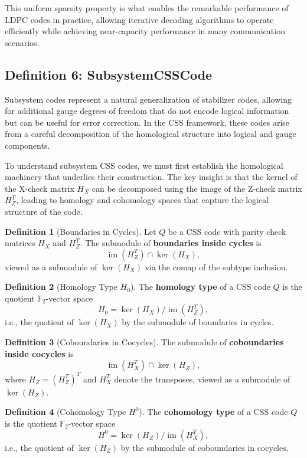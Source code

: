 \documentclass[11pt]{article}
\theoremstyle{plain}
\theoremstyle{definition}
\newtheorem*{definition}{Definition}
\theoremstyle{remark}
\renewcommand{\ker}{\operatorname{ker}}
\begin{document}
This uniform sparsity property is what enables the remarkable performance of LDPC codes in practice, allowing iterative decoding algorithms to operate efficiently while achieving near-capacity performance in many communication scenarios.

\vspace{1em}

\subsection{Definition 6: SubsystemCSSCode}

Subsystem codes represent a natural generalization of stabilizer codes, allowing for additional gauge degrees of freedom that do not encode logical information but can be useful for error correction. In the CSS framework, these codes arise from a careful decomposition of the homological structure into logical and gauge components.

To understand subsystem CSS codes, we must first establish the homological machinery that underlies their construction. The key insight is that the kernel of the X-check matrix $H_X$ can be decomposed using the image of the Z-check matrix $H_Z^T$, leading to homology and cohomology spaces that capture the logical structure of the code.

\begin{definition}[Boundaries in Cycles]
Let $Q$ be a CSS code with parity check matrices $H_X$ and $H_Z^T$. The submodule of \textbf{boundaries inside cycles} is
\[
\operatorname{im}(H_Z^T) \cap \ker(H_X),
\]
viewed as a submodule of $\ker(H_X)$ via the comap of the subtype inclusion.
\end{definition}

\begin{definition}[Homology Type $H_0$]
The \textbf{homology type} of a CSS code $Q$ is the quotient $\mathbb{F}_2$-vector space
\[
H_0 = \ker(H_X) / \operatorname{im}(H_Z^T),
\]
i.e., the quotient of $\ker(H_X)$ by the submodule of boundaries in cycles.
\end{definition}

\begin{definition}[Coboundaries in Cocycles]
The submodule of \textbf{coboundaries inside cocycles} is
\[
\operatorname{im}(H_X^T) \cap \ker(H_Z),
\]
where $H_Z = (H_Z^T)^T$ and $H_X^T$ denote the transposes, viewed as a submodule of $\ker(H_Z)$.
\end{definition}

\begin{definition}[Cohomology Type $H^0$]
The \textbf{cohomology type} of a CSS code $Q$ is the quotient $\mathbb{F}_2$-vector space
\[
H^0 = \ker(H_Z) / \operatorname{im}(H_X^T),
\]
i.e., the quotient of $\ker(H_Z)$ by the submodule of coboundaries in cocycles.
\end{definition}
\end{document}
